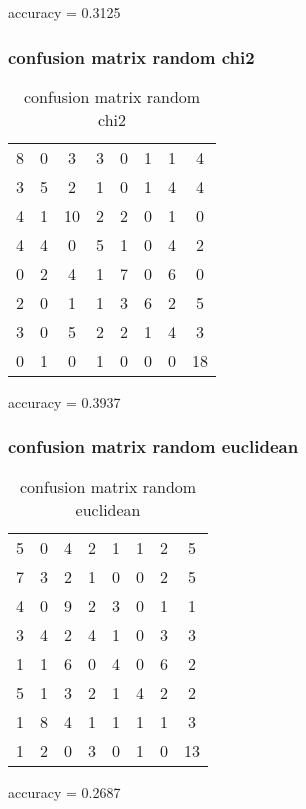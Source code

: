 \documentclass[12pt]{article}
\begin{document}
accuracy = 0.3125

\subsubsection{confusion matrix random chi2}
\begin{table}[H]
\centering
\begin{tabular}{c c c c c c c c}
     8 &     0 &     3 &     3 &     0 &     1 &     1 &     4 \\
     3 &     5 &     2 &     1 &     0 &     1 &     4 &     4 \\
     4 &     1 &    10 &     2 &     2 &     0 &     1 &     0 \\
     4 &     4 &     0 &     5 &     1 &     0 &     4 &     2 \\
     0 &     2 &     4 &     1 &     7 &     0 &     6 &     0 \\
     2 &     0 &     1 &     1 &     3 &     6 &     2 &     5 \\
     3 &     0 &     5 &     2 &     2 &     1 &     4 &     3 \\
     0 &     1 &     0 &     1 &     0 &     0 &     0 &    18 
\end{tabular}
\caption{confusion matrix random chi2}
\label{table:randomchi2}
\end{table}

accuracy = 0.3937

\subsubsection{confusion matrix random euclidean}
\begin{table}[H]
\centering
\begin{tabular}{c c c c c c c c}
     5 &     0 &     4 &     2 &     1 &     1 &     2 &     5 \\
     7 &     3 &     2 &     1 &     0 &     0 &     2 &     5 \\
     4 &     0 &     9 &     2 &     3 &     0 &     1 &     1 \\
     3 &     4 &     2 &     4 &     1 &     0 &     3 &     3 \\
     1 &     1 &     6 &     0 &     4 &     0 &     6 &     2 \\
     5 &     1 &     3 &     2 &     1 &     4 &     2 &     2 \\
     1 &     8 &     4 &     1 &     1 &     1 &     1 &     3 \\
     1 &     2 &     0 &     3 &     0 &     1 &     0 &    13 
\end{tabular}
\caption{confusion matrix random euclidean}
\label{table:randomeuc}
\end{table}

accuracy = 0.2687
\end{document}
